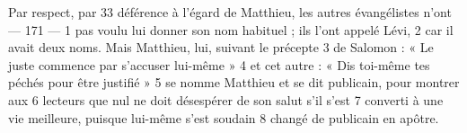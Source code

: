 Par respect, par	 
33	 	déférence à l'égard de Matthieu, les autres évangélistes n'ont	 
 	--- 171 ---	 
1	 	pas voulu lui donner son nom habituel ; ils l'ont appelé Lévi,	 
2	 	car il avait deux noms. Mais Matthieu, lui, suivant le précepte	 
3	 	de Salomon : « Le juste commence par s'accuser lui-même »	 
4	 	et cet autre : « Dis toi-même tes péchés pour être justifié »	 
5	 	se nomme Matthieu et se dit publicain, pour montrer aux	 
6	 	lecteurs que nul ne doit désespérer de son salut s'il s'est	 
7	 	converti à une vie meilleure, puisque lui-même s'est soudain	 
8	 	changé de publicain en apôtre.